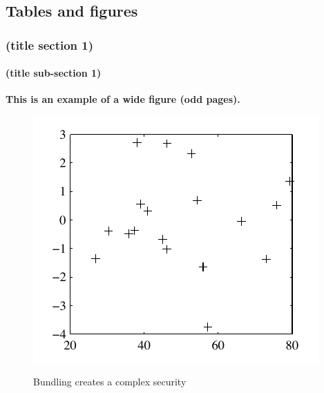\partabstractrp{\lipsum[11]}

\part{}

\chapter{Tables and figures}
\section{(title section 1)}
\subsection{(title sub-section 1)}



\textbf{This is an example of a wide figure (odd pages).}
\begin{figure}[!htbp]
  \wdfigbox
  {\caption{Bundling creates a complex security}}
  {
  \includegraphics{./figure/sample.pdf}
  }
\end{figure}

\lipsum[7-8]

